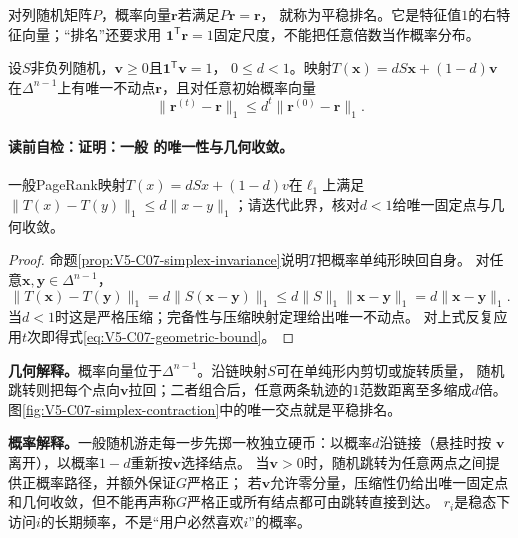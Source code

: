 \begin{definition}[平稳排名与主特征向量]\label{def:V5-C07-stationary-pr}
对列随机矩阵$P$，概率向量$\boldsymbol r$若满足$P\boldsymbol r=\boldsymbol r$，
就称为平稳排名。它是特征值$1$的右特征向量；“排名”还要求用
$\boldsymbol1^{\mathsf T}\boldsymbol r=1$固定尺度，不能把任意倍数当作概率分布。
\end{definition}

\begin{theorem}\label{thm:V5-C07-contraction}
设$S$非负列随机，$\boldsymbol v\ge0$且$\boldsymbol1^{\mathsf T}\boldsymbol v=1$，
$0\le d<1$。映射$T(\boldsymbol x)=dS\boldsymbol x+(1-d)\boldsymbol v$
在$\Delta^{n-1}$上有唯一不动点$\boldsymbol r$，且对任意初始概率向量
\begin{equation}
\|\boldsymbol r^{(t)}-\boldsymbol r\|_1
\le d^t\|\boldsymbol r^{(0)}-\boldsymbol r\|_1.
\label{eq:V5-C07-geometric-bound}
\end{equation}
\end{theorem}
\paragraph{读前自检：证明：一般 的唯一性与几何收敛。}一般PageRank映射$T(x)=dSx+(1-d)v$在$\ell_1$上满足$\lVert T(x)-T(y)\rVert_1\le d\lVert x-y\rVert_1$；请迭代此界，核对$d<1$给唯一固定点与几何收敛。\par

\begin{proof}
命题\ref{prop:V5-C07-simplex-invariance}说明$T$把概率单纯形映回自身。
对任意$\boldsymbol x,\boldsymbol y\in\Delta^{n-1}$，
\[
\|T(\boldsymbol x)-T(\boldsymbol y)\|_1
=d\|S(\boldsymbol x-\boldsymbol y)\|_1
\le d\|S\|_1\|\boldsymbol x-\boldsymbol y\|_1
=d\|\boldsymbol x-\boldsymbol y\|_1.
\]
当$d<1$时这是严格压缩；完备性与压缩映射定理给出唯一不动点。
对上式反复应用$t$次即得式\eqref{eq:V5-C07-geometric-bound}。
\end{proof}

\label{struct:V5-C07-CH14}
\textbf{几何解释。}概率向量位于$\Delta^{n-1}$。沿链映射$S$可在单纯形内剪切或旋转质量，
随机跳转则把每个点向$\boldsymbol v$拉回；二者组合后，任意两条轨迹的$1$范数距离至多缩成$d$倍。
图\ref{fig:V5-C07-simplex-contraction}中的唯一交点就是平稳排名。


\label{struct:V5-C07-CH15}
\textbf{概率解释。}一般随机游走每一步先掷一枚独立硬币：以概率$d$沿链接（悬挂时按
$\boldsymbol v$离开），以概率$1-d$重新按$\boldsymbol v$选择结点。
当$\boldsymbol v>0$时，随机跳转为任意两点之间提供正概率路径，并额外保证$G$严格正；
若$\boldsymbol v$允许零分量，压缩性仍给出唯一固定点和几何收敛，但不能再声称$G$严格正或所有结点都可由跳转直接到达。
$r_i$是稳态下访问$i$的长期频率，不是“用户必然喜欢$i$”的概率。

